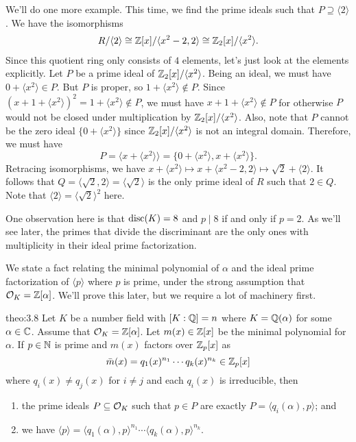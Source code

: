 We'll do one more example. This time, we find the prime ideals such 
that $P \supseteq \langle 2 \rangle$. We have the isomorphisms 
\begin{align*}
    R/\langle 2 \rangle \cong \mathbb{Z}[x]/\langle x^2-2, 2 \rangle 
    \cong \mathbb{Z}_2[x]/\langle x^2 \rangle.
\end{align*}
Since this quotient ring only consists of $4$ elements, let's just look 
at the elements explicitly. Let $P$ be a prime ideal of $\mathbb{Z}_2[x]/\langle x^2 \rangle$. 
Being an ideal, we must have $0 + \langle x^2 \rangle \in P$. But $P$ 
is proper, so $1 + \langle x^2 \rangle \notin P$. Since 
$(x+1 + \langle x^2 \rangle)^2 = 1 + \langle x^2 \rangle \notin P$,
we must have $x+1 + \langle x^2 \rangle \notin P$ for otherwise $P$ 
would not be closed under multiplication by $\mathbb{Z}_2[x]/\langle x^2 \rangle$.
Also, note that $P$ cannot be the zero ideal $\{0 + \langle x^2 \rangle\}$ since 
$\mathbb{Z}_2[x]/\langle x^2 \rangle$ is not an integral domain. Therefore, we must have 
\[ P = \langle x + \langle x^2 \rangle \rangle = \{0 + \langle x^2 \rangle, 
x + \langle x^2 \rangle\}. \] 
Retracing isomorphisms, we have 
$x + \langle x^2 \rangle \mapsto x + \langle x^2-2, 2 \rangle \mapsto 
\sqrt{2} + \langle 2 \rangle$.
It follows that $Q = \langle \sqrt{2}, 2 \rangle = \langle \sqrt{2} \rangle$ 
is the only prime ideal of $R$ such that $2 \in Q$. Note that 
$\langle 2 \rangle = \langle \sqrt{2} \rangle^2$ here.

One observation here is that $\operatorname{disc}(K) = 8$ and $p \mid 8$ if and only if 
$p = 2$. As we'll see later, the primes that divide the discriminant 
are the only ones with multiplicity in their ideal prime factorization. 

We state a fact relating the minimal polynomial of $\alpha$ and the 
ideal prime factorization of $\langle p \rangle$ where $p$ is prime, 
under the strong assumption that ${\cal O}_K = \mathbb{Z}[\alpha]$.  
We'll prove this later, but we require a lot of machinery first.

\begin{theo}{theo:3.8}
    Let $K$ be a number field with $[K : \mathbb{Q}] = n$ where $K = \mathbb{Q}(\alpha)$
    for some $\alpha \in \mathbb{C}$. 
    Assume that ${\cal O}_K = \mathbb{Z}[\alpha]$. Let $m(x) \in \mathbb{Z}[x]$ be the 
    minimal polynomial for $\alpha$. If $p \in \mathbb{N}$ is prime and $m(x)$ 
    factors over $\mathbb{Z}_p[x]$ as 
    \[ \bar{m}(x) = q_1(x)^{n_1} \cdots q_k(x)^{n_k} \in \mathbb{Z}_p[x] \] 
    where $q_i(x) \neq q_j(x)$ for $i \neq j$ and each $q_i(x)$ is irreducible, then 
    \begin{enumerate}[(1)]
        \item the prime ideals $P \subseteq {\cal O}_K$ such that $p \in P$ 
        are exactly $P = \langle q_i(\alpha), p \rangle$; and 
        \item we have $\langle p \rangle = \langle q_1(\alpha), p \rangle^{n_1}
        \cdots \langle q_k(\alpha), p \rangle^{n_k}$. 
    \end{enumerate} 
\end{theo}

